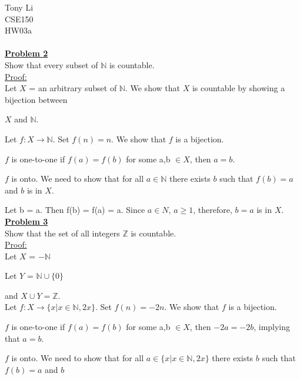 \documentclass[11pt]{article}
\begin{document}
\noindent 
Tony Li \\
CSE150 \\
HW03a \\\\

\noindent\textbf{\underline{Problem 2}}\\
	Show that every subset of $\mathbb{N}$ is countable. \\

	\underline{Proof:} \\

	Let $X$ = an arbitrary subset of $\mathbb{N}$. We show that $X$ is countable by showing a bijection between 

	$X$ and  $\mathbb{N}$. 

	Let $f: X \rightarrow \mathbb{N}$. Set $f(n)=n$. We show that $f$ is a bijection.

	$f$ is one-to-one if $f(a) = f(b)$ for some a,b $\in X$, then $a = b$.

	$f$ is onto. We need to show that for all $a \in \mathbb{N}$ there exists $b$ such that $f(b)=a$ and $b$ is in $X$. 

	Let b = a. Then f(b) = f(a) = a. Since $a \in N$, $a \ge 1$, therefore, $b = a$ is in $X$.\\

\noindent\textbf{\underline{Problem 3}}\\
	Show that the set of all integers $\mathbb{Z}$ is countable. \\

	\underline{Proof:} \\

	Let $X$ = $-\mathbb{N}$

	Let $Y$ = $\mathbb{N} \cup \{0\}$

	and $X \cup Y = \mathbb{Z}$.\\

	Let $f:X \rightarrow \{x|x \in \mathbb{N}, 2x \}$. Set $f(n)=-2n$. We show that $f$ is a bijection.

	$f$ is one-to-one if $f(a) = f(b)$ for some a,b $\in X$, then $-2a = -2b$, implying that $a=b$.

	$f$ is onto. We need to show that for all $a \in \{x|x \in \mathbb{N}, 2x \}$ there exists $b$ such that $f(b)=a$ and $b$ 
\end{document}
